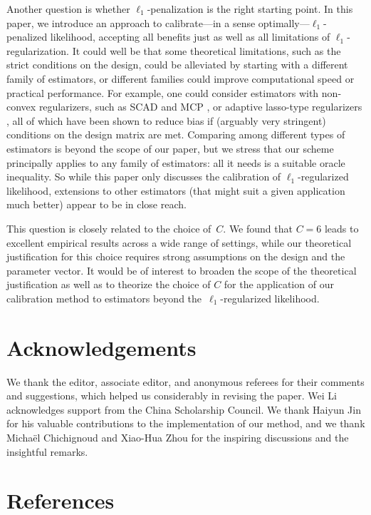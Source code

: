 \documentclass{elsarticle}
\newcommand{\oldnew}{}
\newcommand{\revision}[1]{#1}
\newcommand{\constA}{C}
\begin{document}
\revision{
Another question is whether $\ell_1$-penalization is the right starting point.
In this paper, we introduce an approach to calibrate---in a sense optimally---$\ell_1$-penalized likelihood,
accepting all benefits just as well as all limitations of $\ell_1$-regularization.
It could well be that some theoretical limitations, such as the strict conditions on the design, could be alleviated by starting with a different family of estimators,
or different families could improve computational speed or practical performance.
For example, one could consider estimators with non-convex regularizers, such as SCAD \citep{fan2001variable} and MCP \citep{zhang2010nearly}, or adaptive lasso-type regularizers \citep{zou2006adaptive}, all of which have been shown to reduce bias if (arguably very stringent) conditions on the design matrix are met.
Comparing among different types of estimators is beyond the scope of our paper,
but we stress that our scheme principally applies to any family of estimators:
all it needs is a suitable oracle inequality.
So while this paper only discusses the calibration of $\ell_1$-regularized likelihood,
extensions to other estimators (that might suit a given application much better) appear to be in close reach.
}


\revision{This question is closely related to the choice of~$\constA$.
We found that $\constA=6$ leads to excellent empirical results across a wide range of settings,
while our theoretical justification for this choice requires strong assumptions on the design and the parameter vector.
It would be of interest to broaden the scope of the theoretical justification as well as to theorize the choice of $\constA$ for the application of our calibration method to estimators beyond the~$\ell_1$-regularized likelihood.
}




\section*{Acknowledgements}

{\oldnew We thank the editor, associate editor, and anonymous referees for their comments and suggestions, which helped us considerably in revising the paper.} Wei Li acknowledges support from the China Scholarship Council. We thank Haiyun Jin for his valuable contributions to the implementation of our method, and we thank Micha\"el Chichignoud and Xiao-Hua Zhou for the inspiring discussions and the insightful remarks.


\section*{References}
\end{document}
